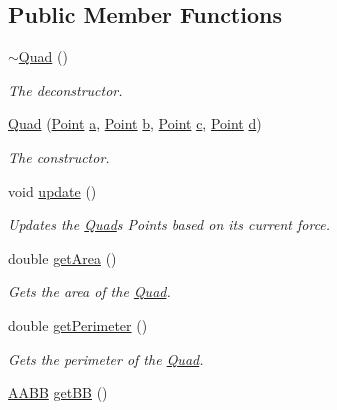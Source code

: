 \subsection*{Public Member Functions}
\begin{DoxyCompactItemize}
\item 
\mbox{\hyperlink{class_quad_a5db77c0481b30c0b7c1014cc535284ad}{$\sim$\+Quad}} ()
\begin{DoxyCompactList}\small\item\em The deconstructor. \end{DoxyCompactList}\item 
\mbox{\hyperlink{class_quad_a42dd3b1c1f81ec0f0e5c41116cb92d05}{Quad}} (\mbox{\hyperlink{class_point}{Point}} \mbox{\hyperlink{class_quad_a6d2e2a508ba54fd2c0d286850d2fc99f}{a}}, \mbox{\hyperlink{class_point}{Point}} \mbox{\hyperlink{class_quad_a429f3bf619a9e29f56e03c701001d508}{b}}, \mbox{\hyperlink{class_point}{Point}} \mbox{\hyperlink{class_quad_a90ece951ddbf1c23049a912e26068680}{c}}, \mbox{\hyperlink{class_point}{Point}} \mbox{\hyperlink{class_quad_ac1855601f7ffc0f7d77f06ee60d541d6}{d}})
\begin{DoxyCompactList}\small\item\em The constructor. \end{DoxyCompactList}\item 
void \mbox{\hyperlink{class_quad_a5e8eed8827894a4cf680b827a90d9d28}{update}} ()
\begin{DoxyCompactList}\small\item\em Updates the \mbox{\hyperlink{class_quad}{Quad}}\textquotesingle{}s Points based on its current force. \end{DoxyCompactList}\item 
double \mbox{\hyperlink{class_quad_abd7230629190e09ee3bdadefb6784320}{get\+Area}} ()
\begin{DoxyCompactList}\small\item\em Gets the area of the \mbox{\hyperlink{class_quad}{Quad}}. \end{DoxyCompactList}\item 
double \mbox{\hyperlink{class_quad_a8d438e2844a4a155ed61addfab1a2868}{get\+Perimeter}} ()
\begin{DoxyCompactList}\small\item\em Gets the perimeter of the \mbox{\hyperlink{class_quad}{Quad}}. \end{DoxyCompactList}\item 
\mbox{\hyperlink{class_a_a_b_b}{A\+A\+BB}} \mbox{\hyperlink{class_quad_a8b7be43a01fb3263d36b0eb2f5961ccd}{get\+BB}} ()

\end{DoxyCompactItemize}
